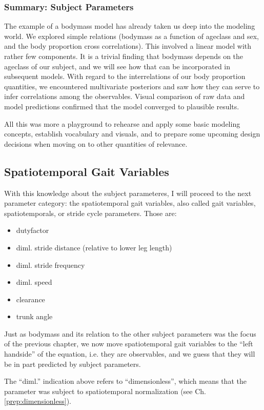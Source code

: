 \subsubsection{Summary: Subject Parameters}
\label{sec:orge0c65f9}
The example of a bodymass model has already taken us deep into the modeling world.
We explored simple relations (bodymass as a function of ageclass and sex, and the body proportion cross correlations).
This involved a linear model with rather few components.
It is a trivial finding that bodymass depends on the ageclass of our subject, and we will see how that can be incorporated in subsequent models.
With regard to the interrelations of our body proportion quantities, we encountered multivariate posteriors and saw how they can serve to infer correlations among the observables.
Visual comparison of raw data and model predictions confirmed that the model converged to plausible results.

All this was more a playground to rehearse and apply some basic modeling concepts, establish vocabulary and visuals, and to prepare some upcoming design decisions when moving on to other quantities of relevance.

\FloatBarrier\clearpage
\subsection{Spatiotemporal Gait Variables}
\label{sec:org69bec74}
With this knowledge about the subject parameteres, I will proceed to the next parameter category: the spatiotemporal gait variables, also called gait variables, spatiotemporals, or stride cycle parameters. Those are:
\begin{itemize}
\item dutyfactor
\item diml. stride distance (relative to lower leg length)
\item diml. stride frequency
\item diml. speed
\item clearance
\item trunk angle
\end{itemize}

Just as bodymass and its relation to the other subject parameters was the focus of the previous chapter, we now move spatiotemporal gait variables to the ``left handside'' of the equation, i.e. they are observables, and we guess that they will be in part predicted by subject parameters.

The ``diml.'' indication above refers to ``dimensionless'', which means that the parameter was subject to spatiotemporal normalization (see Ch. \ref{prep:dimensionless}).


